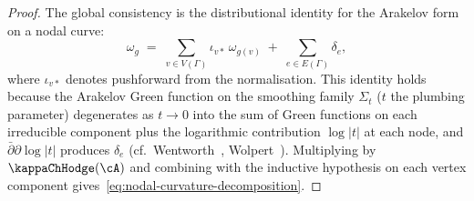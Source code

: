 \begin{proof}
The global consistency is the distributional identity for the
Arakelov form on a nodal curve:
\[
 \omega_g
 \;=\;
 \sum_{v\in V(\Gamma)} \iota_{v*}\,\omega_{g(v)}
 \;+\;
 \sum_{e\in E(\Gamma)} \delta_e,
\]
where $\iota_{v*}$ denotes pushforward from the normalisation.
This identity holds because the Arakelov Green function on the
smoothing family $\Sigma_t$ ($t$ the plumbing parameter)
degenerates as $t\to 0$ into the sum of Green functions on
each irreducible component plus the logarithmic contribution
$\log|t|$ at each node, and $\bar\partial\partial\log|t|$
produces $\delta_e$
(cf.\ Wentworth~\cite{Wentworth91},
Wolpert~\cite{Wolpert90}).
Multiplying by $\kappaChHodge(\cA)$ and combining with the inductive
hypothesis on each vertex component
gives~\eqref{eq:nodal-curvature-decomposition}.
\end{proof}

